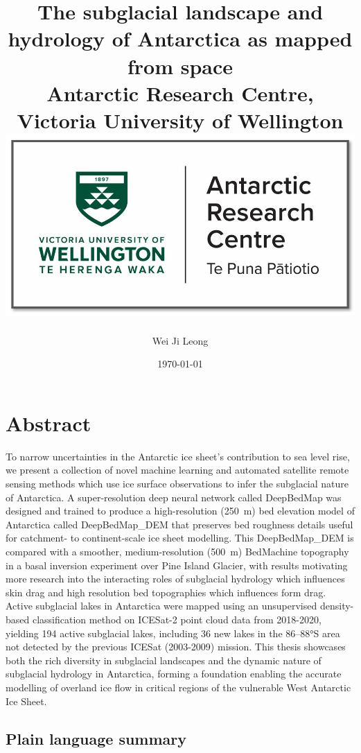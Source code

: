 \documentclass[12pt,twoside]{book}
\title{
{The subglacial landscape and hydrology of Antarctica as mapped from space}\\
{\large Antarctic Research Centre, Victoria University of Wellington}\\
{\includegraphics[scale=0.5]{0_arc_logo.jpg}}
}
\author{Wei Ji Leong}
\date{\today}
\begin{document}


\chapter*{Abstract}

To narrow uncertainties in the Antarctic ice sheet's contribution to sea level rise, we present a collection of novel machine learning and automated satellite remote sensing methods which use ice surface observations to infer the subglacial nature of Antarctica.
A super-resolution deep neural network called DeepBedMap was designed and trained to produce a high-resolution (\SI{250}{\metre}) bed elevation model of Antarctica called DeepBedMap\_DEM that preserves bed roughness details useful for catchment- to continent-scale ice sheet modelling.
This DeepBedMap\_DEM is compared with a smoother, medium-resolution (\SI{500}{\metre}) BedMachine topography in a basal inversion experiment over Pine Island Glacier, with results motivating more research into the interacting roles of subglacial hydrology which influences skin drag and high resolution bed topographies which influences form drag.
Active subglacial lakes in Antarctica were mapped using an unsupervised density-based classification method on ICESat-2 point cloud data from 2018-2020, yielding 194 active subglacial lakes, including 36 new lakes in the 86--88°S area not detected by the previous ICESat (2003-2009) mission.
This thesis showcases both the rich diversity in subglacial landscapes and the dynamic nature of subglacial hydrology in Antarctica, forming a foundation enabling the accurate modelling of overland ice flow in critical regions of the vulnerable West Antarctic Ice Sheet.

\section*{Plain language summary}
\end{document}

